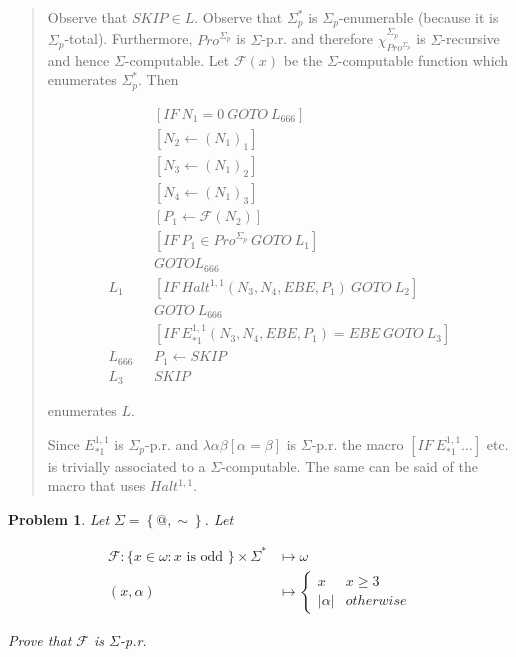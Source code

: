 \documentclass[a4paper, 12pt]{article}
\newtheorem{problem}{Problem}
\newtheorem{problem}{Problem}
\begin{document}
\small
\begin{quote}

    Observe that $SKIP \in L$. Observe that $\Sigma_p^*$ is
    $\Sigma_p$-enumerable (because it is $\Sigma_p$-total). Furthermore,
    $Pro^{\Sigma_p}$ is $\Sigma$-p.r. and therefore
    $\chi_{Pro^{\Sigma_p}}^{\Sigma_p}$ is $\Sigma$-recursive and hence
    $\Sigma$-computable. Let $\mathcal{F}(x)$ be the $\Sigma$-computable function which enumerates
    $\Sigma_p^*$. Then

    \begin{align*}
        &[IF ~ N_1 = 0 ~ GOTO ~ L_{666}] \\ 
        &[N_2 \leftarrow (N_1)_1]\\
        &[N_3 \leftarrow (N_1)_2]\\
        &[N_4 \leftarrow (N_1)_3] \\ 
        &[P_1 \leftarrow \mathcal{F}(N_2)] \\ 
        &[IF ~ P_1 \in Pro^{\Sigma_p} ~ GOTO ~ L_1] \\ 
        &GOTO L_{666} \\ 
        L_1 ~ ~ ~ &[IF ~ Halt^{1, 1}\left( N_3, N_4, EBE, P_1 \right) ~ GOTO ~
        L_2 ] \\ 
                  &GOTO ~ L_{666} \\ 
        &[IF ~ E_{*1}^{1, 1} \left( N_3, N_4, EBE, P_1 \right) = EBE ~ GOTO ~
        L_3] \\ 
        L_{666} ~ ~ ~ &P_1 \leftarrow SKIP \\ 
        L_3 ~ ~ ~ & SKIP
    \end{align*}

    enumerates $L$.

    Since $E_{*1}^{1, 1}$ is $\Sigma_p$-p.r. and $\lambda \alpha\beta \left[
    \alpha = \beta  \right]$ is $\Sigma$-p.r. the macro $[IF ~ E_{*1}^{1, 1}
    \ldots]$ etc. is trivially associated to a $\Sigma$-computable. The same can
    be said of the macro that uses $Halt^{1, 1}$.

\end{quote}
\normalsize

\begin{problem}
    Let $\Sigma = \left\{ @, \sim  \right\} $. Let 

    \begin{align*}
        \mathcal{F} : \{x \in \omega : x \text{ is odd }\} \times \Sigma^{*} &\mapsto
        \omega \\ 
        (x, \alpha) &\mapsto \begin{cases}
            x & x \geq 3 \\ 
            |\alpha| & otherwise
        \end{cases}
    \end{align*}

    Prove that $\mathcal{F}$ is $\Sigma$-p.r. 
\end{problem}
\end{document}

